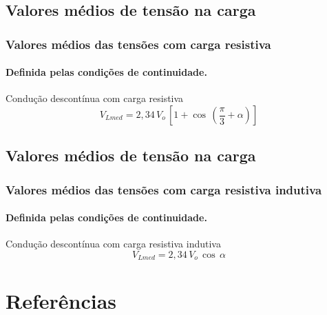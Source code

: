 \documentclass[aspectratio=43]{beamer}
\begin{document}
\subsection{Valores médios de tensão na carga }
\begin{frame}
	\frametitle{Valores médios das tensões com carga resistiva}
	\framesubtitle{Definida pelas condições de continuidade.}

	\begin{block}{Condução descontínua com carga resistiva}
		\begin{equation}
		{V_{Lmed}} = 2,34\,{V_{o}}\,\left[ {1 + \cos \,\left( {\frac{\pi }{3} + \alpha } \right)} \right]
		\end{equation}
	\end{block}
	
	

	
	
\end{frame}





\subsection{Valores médios de tensão na carga }
\begin{frame}
	\frametitle{Valores médios das tensões com carga resistiva indutiva}
	\framesubtitle{Definida pelas condições de continuidade.}
	
	
	\begin{block}{Condução descontínua com carga resistiva indutiva}
		\begin{equation}
		{V_{Lmed}} = 2,34\,{V_o}\,\cos \,\alpha 
		\end{equation}
	\end{block}
	
	
\end{frame}


\section{Referências}

\end{document}
